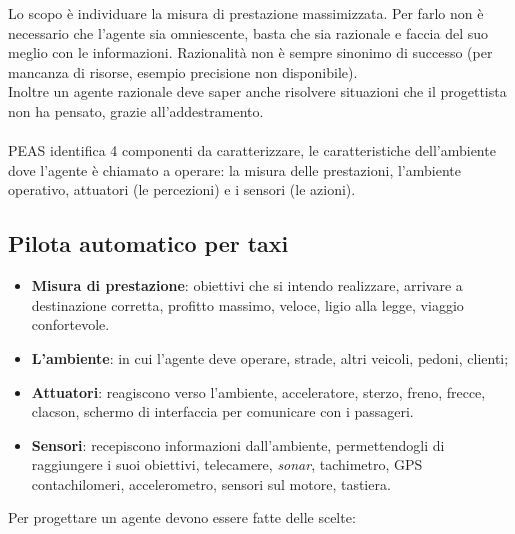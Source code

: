 \documentclass[10pt,a4paper]{book}
\begin{document}
Lo scopo \`e individuare la misura di prestazione massimizzata. Per farlo non \`e necessario che l'agente sia omniescente, basta che sia razionale e faccia del suo meglio con le informazioni. Razionalit\`a non \`e sempre sinonimo di successo (per mancanza di risorse, esempio precisione non disponibile).\\
Inoltre un agente razionale deve saper anche risolvere situazioni che il progettista non ha pensato, grazie all'addestramento.\\
\\
PEAS identifica 4 componenti da caratterizzare, le caratteristiche dell'ambiente dove l'agente \`e chiamato a operare: la misura delle prestazioni, l'ambiente operativo, attuatori (le percezioni) e i sensori (le azioni). 

\subsection{Pilota automatico per taxi}
\begin{itemize}
\item \textbf{Misura di prestazione}: obiettivi che si intendo realizzare, arrivare a destinazione corretta, profitto massimo, veloce, ligio alla legge, viaggio confortevole.
\item \textbf{L'ambiente}: in cui l'agente deve operare, strade, altri veicoli, pedoni, clienti;
\item \textbf{Attuatori}: reagiscono verso l'ambiente, acceleratore, sterzo, freno, frecce, clacson, schermo di interfaccia per comunicare con i passageri.
\item \textbf{Sensori}: recepiscono informazioni dall'ambiente, permettendogli di raggiungere i suoi obiettivi, telecamere, \textit{sonar}, tachimetro, GPS contachilomeri, accelerometro, sensori sul motore, tastiera.
\end{itemize}
\noindent
Per progettare un agente devono essere fatte delle scelte:
\end{document}
